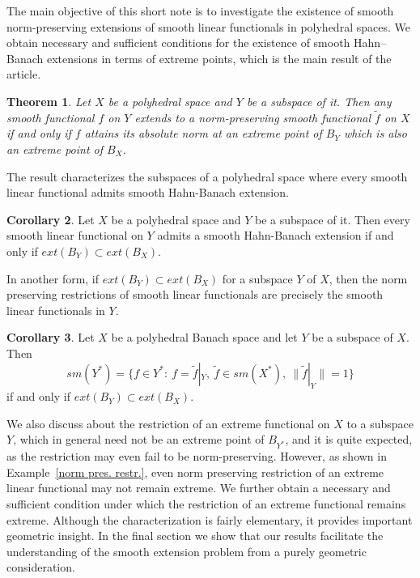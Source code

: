\documentclass{amsart}
\newtheorem{theorem}{Theorem}[section]
\theoremstyle{definition}
\newtheorem{corollary}[theorem]{Corollary}
\theoremstyle{remark}
\numberwithin{equation}{section}
\begin{document}
\noindent The main objective of this short note is to investigate the existence of smooth norm-preserving extensions of smooth linear functionals in polyhedral spaces. We obtain necessary and sufficient conditions for the existence of smooth Hahn–Banach extensions in terms of extreme points, which is the main result of the article.
\begin{theorem}\label{smooth HB liftings} 
Let $X$ be a polyhedral space and $Y$ be a subspace of it. Then any smooth functional $f$ on $Y$ extends to a norm-preserving smooth functional $\widetilde{f}$ on $X$ if and only if $f$ attains its absolute norm at an extreme point of $B_Y$ which is also an extreme point of $B_X$.
\end{theorem}
\noindent The result characterizes the subspaces of a polyhedral space where every smooth linear functional admits smooth Hahn-Banach extension.
\begin{corollary}\label{first cor}
Let $X$ be a polyhedral space and $Y$ be a subspace of it. Then every smooth linear functional on $Y$ admits a smooth Hahn-Banach extension if and only if $ext(B_Y)\subset ext(B_X)$.
\end{corollary}
\noindent In another form, if $ext(B_Y)\subset ext(B_X)$ for a subspace $Y$ of $X$, then the norm preserving restrictions of smooth linear functionals are precisely the smooth linear functionals in $Y$.
\begin{corollary}\label{second cor}
Let $X$ be a polyhedral Banach space and let $Y$ be a subspace of $X$. Then 
\begin{equation}\label{Equation: smooth}
sm(Y^*)=\{f\in Y^*:~f=\widetilde{f}|_Y,~\widetilde{f}\in sm(X^*),~\|\widetilde{f}|_Y\|=1\}  
\end{equation}
if and only if $ext(B_Y)\subset ext(B_X)$.
\end{corollary}
\noindent We also discuss about the restriction of an extreme functional on $X$ to a subspace $Y$, which in general need not be an extreme point of $B_{Y^*}$, and it is quite expected, as the restriction may even fail to be norm-preserving. However, as shown in Example~\ref{norm pres. restr.}, even norm preserving restriction of an extreme linear functional may not remain extreme. We further obtain a necessary and sufficient condition under which the restriction of an extreme functional remains extreme. Although the characterization is fairly elementary, it provides important geometric insight. In the final section we show that our results facilitate the understanding of the smooth extension problem from a purely geometric consideration. 
\end{document}
